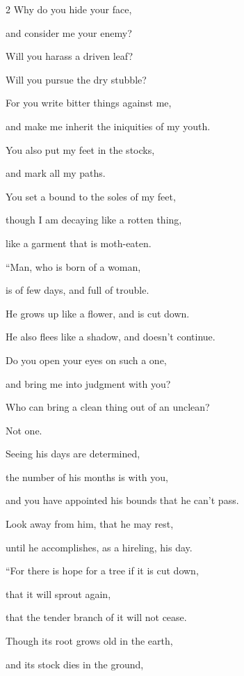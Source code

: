 \begin{multicols}{2}
	\myverse{}Why do you hide your face,
	
	and consider me your enemy?
	
	\myverse{}Will you harass a driven leaf?
	
	Will you pursue the dry stubble?
	
	\myverse{}For you write bitter things against me,
	
	and make me inherit the iniquities of my youth.
	
	\myverse{}You also put my feet in the stocks,
	
	and mark all my paths.
	
	You set a bound to the soles of my feet,
	
	\myverse{}though I am decaying like a rotten thing,
	
	like a garment that is moth-eaten.
	
	
	
	
	\mychapter{} \myverse*{}“Man, who is born of a woman,
	
	\quad\quad is of few days, and full of trouble.
	
	\myverse{}He grows up like a flower, and is cut down.
	
	He also flees like a shadow, and doesn’t continue.
	
	\myverse{}Do you open your eyes on such a one,
	
	and bring me into judgment with you?
	
	\myverse{}Who can bring a clean thing out of an unclean?
	
	Not one.
	
	\myverse{}Seeing his days are determined,
	
	the number of his months is with you,
	
	and you have appointed his bounds that he can’t pass.
	
	\myverse{}Look away from him, that he may rest,
	
	until he accomplishes, as a hireling, his day.
	
	\vspace{\baselineskip}
	
	\myverse{}“For there is hope for a tree if it is cut down,
	
	that it will sprout again,
	
	that the tender branch of it will not cease.
	
	\myverse{}Though its root grows old in the earth,
	
	and its stock dies in the ground,
	

\end{multicols}
